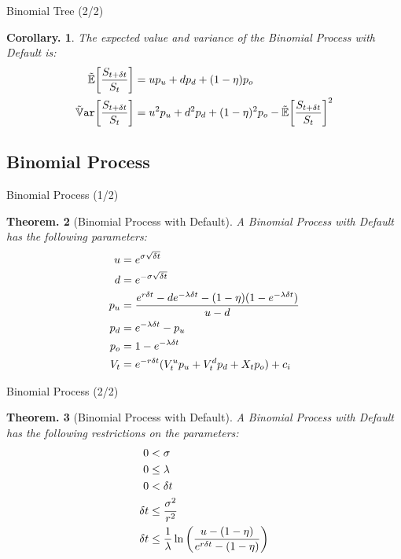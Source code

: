 \documentclass{beamer}
\newtheorem{thm}{Theorem.}
\newtheorem{cor}[thm]{Corollary.}
\begin{document}
\begin{frame}{Binomial Tree (2/2)}
\begin{cor}
The expected value and variance of the Binomial Process with Default is:
\begin{align}
 \E[\frac{\SDt}{\S}]   &= \u\pu + \d\pd + (1 - \eta)\po \\
 \Var[\frac{\SDt}{\S}] &= \u^2\pu + \d^2\pd + (1 - \eta)^2\po - \E[\frac{\SDt}{\S}]^2
\end{align}
\end{cor}
\end{frame}


\subsection{Binomial Process}

\begin{frame}{Binomial Process (1/2)}
\begin{thm}[Binomial Process with Default]
A Binomial Process with Default has the following parameters:
\begin{align*}
  u  &= e^{\sigma\sqrt{\delta t}} \\
  d  &= e^{-\sigma\sqrt{\delta t}} \\
  p_u &= \frac{e^{r\delta t} - d e^{-\lambda\delta t} - (1 - \eta)(1 - e^{-\lambda\delta t})}{u - d} \\
  p_d &= e^{-\lambda\delta t} - p_u \\
  p_o &= 1 - e^{-\lambda\delta t} \\
  V_t  &= e^{-r\delta t}(V^{u}_tp_u + V^{d}_tp_d + X_tp_o) + c_i \\
\end{align*}
\end{thm}
\end{frame}

\begin{frame}{Binomial Process (2/2)}
\begin{thm}[Binomial Process with Default]
A Binomial Process with Default has the following restrictions on the parameters:
\begin{align*}
  0   &< \sigma \\
  0   &\le \lambda \\
  0   &< \delta t \\
  \delta t &\le \frac{\sigma^2}{r^2} \\
  \delta t &\le \frac{1}{\lambda}\ln\left(\frac{u - (1 - \eta)}{e^{r\delta t} - (1 - \eta)}\right) \\
\end{align*}
\end{thm}
\end{frame}
\end{document}
